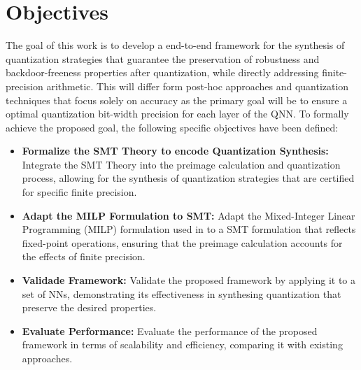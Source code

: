 \begin{comment}
    
    Several works have explored the verification of neural networks, particularly focusing on verification problem like a code problem \cite{cordeiro2025neuralnetworkverificationprogramming}. Some works like \cite{katz2017reluplex,katz2019marabou,abdi2021counterexample,song2023qnnrepair} use SMT solvers to verify the integrity of QNN by checking properties such as robustness\footnote{resistência a perturbações} and safety. However, these approuches typically do not scale well to large models and also do not take into account the fixed-point precision used in quantized models. In contrast, the use of MILP solvers has been proposed to verify the preimage of QNNs \cite{cai2025certified}. This approach allows for the verification of robustness and backdoor-freeness properties of QNNs. Though the work lacks to consider the fixed-point precision used in quantized models as done by \cite{baranowski2020smt}. It then lays the foundation for our work.
    
\end{comment}

\section{Objectives}\label{sec:objectives}

The goal of this work is to develop a end-to-end framework for the synthesis of quantization strategies that guarantee the preservation of robustness and backdoor-freeness properties after quantization, while directly addressing finite-precision arithmetic. This will differ form post-hoc approaches and quantization techniques that focus solely on accuracy as the primary goal will be to ensure a optimal quantization bit-width precision for each layer of the QNN. To formally achieve the proposed goal, the following specific objectives have been defined:

\begin{itemize}
    \item \textbf{Formalize the SMT Theory to encode Quantization Synthesis:} Integrate the SMT Theory into the preimage calculation and quantization process, allowing for the synthesis of quantization strategies that are certified for specific finite precision.
    \item \textbf{Adapt the MILP Formulation to SMT:} Adapt the Mixed-Integer Linear Programming (MILP) formulation used in \cite{cai2025certified} to a SMT formulation that reflects fixed-point operations, ensuring that the preimage calculation accounts for the effects of finite precision.
    \item \textbf{Validade Framework:} Validate the proposed framework by applying it to a set of NNs, demonstrating its effectiveness in synthesing quantization that preserve the desired properties.
    \item \textbf{Evaluate Performance:} Evaluate the performance of the proposed framework in terms of scalability and efficiency, comparing it with existing approaches. 
    
\end{itemize}

